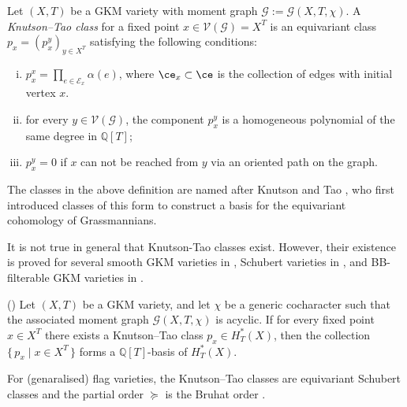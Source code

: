 \documentclass[10pt, a4paper, reqno]{amsart}
\begin{document}
\begin{defe}\label{ktclass}
	Let $(X,T)$ be a GKM variety with moment graph $\mathcal{G} := \mathcal{G}(X,T,\chi)$.  
	A \emph{Knutson--Tao class} for a fixed point $x \in \mathcal{V(G)} = X^T$ is an equivariant class 
	\( p_x = (p_x^y)_{y \in X^T} \)
	satisfying the following conditions:
	\begin{enumerate}[(i)]
		\item \( p_x^x = \displaystyle\prod_{e \in \mathcal{E}_x} \alpha(e) \), where $\ce_x\subset \ce$ is the collection of edges with initial vertex $x$. 
		\item for every  \( y \in \mathcal{V(G)} \), the component \( p_x^y \) is a homogeneous polynomial of the same degree in \( \mathbb{Q}[T] \);
	 \item $p_x^y = 0 $ if $x$ can not be reached from $y$ via an oriented path on the graph.
	\end{enumerate}
\end{defe}
The classes in the above definition are named after Knutson and Tao  \cite{kt}, who first introduced classes of this form to construct a basis for the equivariant cohomology of Grassmannians.
\begin{rema}
It is not true in general that Knutson-Tao classes exist.  However, their existence is proved for several smooth GKM varieties in \cite{gz03}, Schubert varieties in \cite[Section 3]{t081}, and BB-filterable GKM varieties in \cite[Theorem 3.9]{lp231}.
\end{rema}





\begin{propo}\label{ktclassformsbasis}(\cite[Proposition 2.13]{t081})
	Let $(X,T)$ be a GKM variety, and let $\chi$ be a generic cocharacter such that the associated moment graph 
	$\mathcal{G}(X,T,\chi)$ is acyclic.  
	If for every fixed point $x \in X^T$ there exists a Knutson--Tao class 
	\( p_x \in H_T^*(X) \),  
	then the collection \( \{\,p_x \mid x \in X^T\,\} \) forms a 
	\( \mathbb{Q}[T] \)-basis of \( H_T^*(X) \).
\end{propo}



\begin{rema}
	For (genaralised) flag varieties, the Knutson--Tao classes are equivariant Schubert classes and the partial order $\succeq$ is the Bruhat order \cite[Proposition 4.6 and Proposition 4.7]{t081}.
\end{rema}
\end{document}
